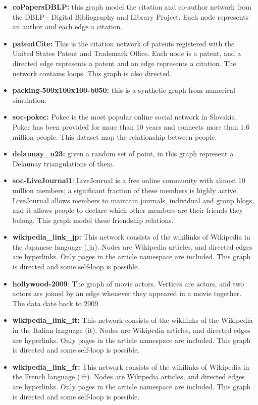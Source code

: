 \begin{itemize}
	\item \textbf{coPapersDBLP:} this graph model the citation and co-author network from the DBLP - Digital Bibliography and Library Project. Each node represents an author and each edge a citation.
	\item \textbf{patentCite:} This is the citation network of patents registered with the United States Patent and Trademark Office. Each node is a patent, and a directed edge represents a patent and an edge represents a citation. The network contains loops. This graph is also directed.
	\item \textbf{packing-500x100x100-b050:} this is a synthetic graph from numerical simulation.  
	\item \textbf{soc-pokec:} Pokec is the most popular online social network in Slovakia. Pokec has been provided for more than 10 years and connects more than 1.6 million people. This dataset map the relationship between people.
	\item \textbf{delaunay\_n23:} given a random set of point, in this graph represent a Delaunay triangulations of them.
	\item \textbf{soc-LiveJournal1}: LiveJournal is a free online community with almost 10 million members; a significant fraction of these members is highly active. LiveJournal allows members to maintain journals, individual and group blogs, and it allows people to declare which other members are their friends they belong. This graph model these friendship relations. 
	\item \textbf{wikipedia\_link\_jp:} This network consists of the wikilinks of Wikipedia in the Japanese language (.ja). Nodes are Wikipedia articles, and directed edges are hyperlinks. Only pages in the article namespace are included. This graph is directed and some self-loop is possible.
	\item \textbf{hollywood-2009}: The graph of           
	movie actors. Vertices are actors, and two actors are joined by an edge whenever they appeared in a movie together. The data date back to 2009. 
	\item \textbf{wikipedia\_link\_it:} This network consists of the wikilinks of the Wikipedia in the Italian language (it). Nodes are Wikipedia articles, and directed edges are hyperlinks. Only pages in the article namespace are included. This graph is directed and some self-loop is possible.
	\item \textbf{wikipedia\_link\_fr:} This network consists of the wikilinks of Wikipedia in the French language (.fr). Nodes are Wikipedia articles, and directed edges are hyperlinks. Only pages in the article namespace are included. This graph is directed and some self-loop is possible.

\end{itemize}
